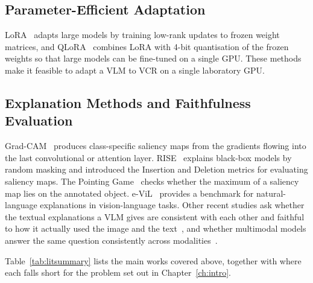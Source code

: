 \subsection{Parameter-Efficient Adaptation}
LoRA~\cite{hu2022lora} adapts large models by training low-rank updates to frozen weight matrices, and QLoRA~\cite{dettmers2023qlora} combines LoRA with 4-bit quantisation of the frozen weights so that large models can be fine-tuned on a single GPU. These methods make it feasible to adapt a VLM to VCR on a single laboratory GPU.

\subsection{Explanation Methods and Faithfulness Evaluation}
Grad-CAM~\cite{selvaraju2017gradcam} produces class-specific saliency maps from the gradients flowing into the last convolutional or attention layer. RISE~\cite{petsiuk2018rise} explains black-box models by random masking and introduced the Insertion and Deletion metrics for evaluating saliency maps. The Pointing Game~\cite{zhang2018excitation} checks whether the maximum of a saliency map lies on the annotated object. e-ViL~\cite{kayser2021evil} provides a benchmark for natural-language explanations in vision-language tasks. Other recent studies ask whether the textual explanations a VLM gives are consistent with each other and faithful to how it actually used the image and the text~\cite{parcalabescu2025faithfulness}, and whether multimodal models answer the same question consistently across modalities~\cite{zhang2024crossmodal}.

Table~\ref{tab:litsummary} lists the main works covered above, together with where each falls short for the problem set out in Chapter~\ref{ch:intro}.

